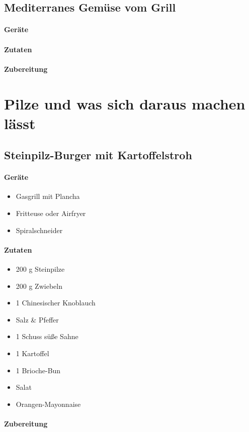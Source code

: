\subsection{Mediterranes Gemüse vom Grill}

\paragraph{Geräte}

\paragraph{Zutaten}

\paragraph{Zubereitung}



\section{Pilze und was sich daraus machen lässt}

\subsection{Steinpilz-Burger mit Kartoffelstroh}

\paragraph{Geräte}

\begin{itemize}[noitemsep]
	\item Gasgrill mit Plancha
	\item Fritteuse oder Airfryer
	\item Spiralschneider
\end{itemize}

\paragraph{Zutaten}

\begin{itemize}[noitemsep]
	\item 200 g Steinpilze
	\item 200 g Zwiebeln
	\item 1 Chinesischer Knoblauch
	\item Salz \& Pfeffer
	\item 1 Schuss süße Sahne
	\item 1 Kartoffel
	\item 1 Brioche-Bun
	\item Salat
	\item Orangen-Mayonnaise
\end{itemize}

\paragraph{Zubereitung}



